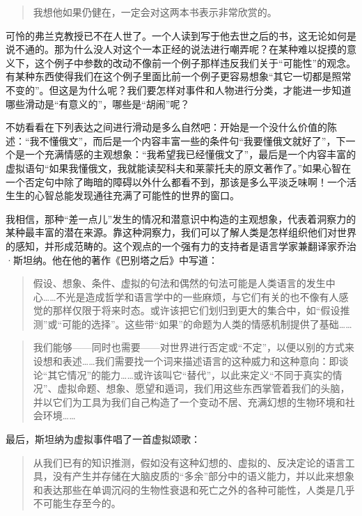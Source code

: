 \begin{quote}
我想他如果仍健在，一定会对这两本书表示非常欣赏的。
\end{quote}

可怜的弗兰克教授已不在人世了。一个人读到写于他去世之后的书，这无论如何是说不通的。那为什么没人对这个一本正经的说法进行嘲弄呢？在某种难以捉摸的意义下，这个例子中参数的改动不像前一个例子那样违反我们关于“可能性”的观念。有某种东西使得我们在这个例子里面比前一个例子更容易想象“其它一切都是照常不变的”。但这是为什么呢？我们要怎样对事件和人物进行分类，才能进一步知道哪些滑动是“有意义的”，哪些是“胡闹”呢？

不妨看看在下列表达之间进行滑动是多么自然吧：开始是一个没什么价值的陈述：“我不懂俄文”，而后是一个内容丰富一些的条件句“我要懂俄文就好了”，下一个是一个充满情感的主观想象：“我希望我已经懂俄文了”，最后是一个内容丰富的虚拟语句“如果我懂俄文，我就能读契科夫和莱蒙托夫的原文著作了。”如果心智在一个否定句中除了晦暗的障碍以外什么都看不到，那该是多么平淡乏味啊！一个活生生的心智总能发现通往充满了可能性的世界的窗口。

我相信，那种“差一点儿”发生的情况和潜意识中构造的主观想象，代表着洞察力的某种最丰富的潜在来源。靠这种洞察力，我们可以了解人类是怎样组织他们对世界的感知，并形成范畴的。这个观点的一个强有力的支持者是语言学家兼翻译家乔治·斯坦纳。他在他的著作《巴别塔之后》中写道：

\begin{quote}
假设、想象、条件、虚拟的句法和偶然的句法可能是人类语言的发生中心……不光是造成哲学和语言学中的一些麻烦，与它们有关的也不像有人感觉的那样仅限于将来时态。或许该把它们划归到更大的集合中，如“假设推测”或“可能的选择”。这些带“如果”的命题为人类的情感机制提供了基础……
\end{quote}

\begin{quote}
我们能够——同时也需要——对世界进行否定或“不定”，以便以别的方式来设想和表述……我们需要找一个词来描述语言的这种威力和这种意向：即谈论“其它情况”的能力……或许该叫它“替代”，以此来定义“不同于真实的情况”、虚拟命题、想象、愿望和遁词，我们用这些东西掌管着我们的头脑，并以它们为工具为我们自己构造了一个变动不居、充满幻想的生物环境和社会环境……
\end{quote}

最后，斯坦纳为虚拟事件唱了一首虚拟颂歌：

\begin{quote}
从我们已有的知识推测，假如没有这种幻想的、虚拟的、反决定论的语言工具，没有产生并存储在大脑皮质的“多余”部分中的语义能力，并以此来想象和表达那些在单调沉闷的生物性衰退和死亡之外的各种可能性，人类是几乎不可能生存至今的。
\end{quote}

